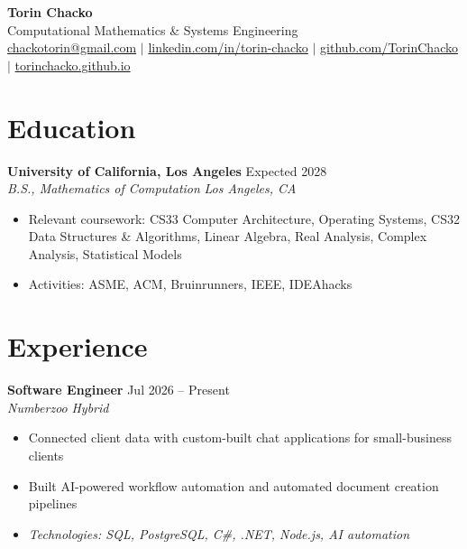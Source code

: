 \documentclass[10pt,letterpaper]{article}
\newcommand{\entry}[4]{%
    \textbf{#1} \hfill #2 \\
    \textit{#3} \hfill \textit{#4} \\
    \vspace{2pt}
}
\begin{document}
\small

\begin{center}
    {\LARGE \bfseries Torin Chacko} \\[5pt]
    Computational Mathematics \& Systems Engineering \\[4pt]
    \href{mailto:chackotorin@gmail.com}{chackotorin@gmail.com}
    \quad $|$ \quad
    \href{https://linkedin.com/in/torin-chacko}{linkedin.com/in/torin-chacko}
    \quad $|$ \quad
    \href{https://github.com/TorinChacko}{github.com/TorinChacko}
    \quad $|$ \quad
    \href{https://torinchacko.github.io}{torinchacko.github.io}
\end{center}

\vspace{3pt}

\section*{Education}

\entry
    {University of California, Los Angeles}
    {Expected 2028}
    {B.S., Mathematics of Computation}
    {Los Angeles, CA}

\begin{itemize}
    \item Relevant coursework: CS33 Computer Architecture, Operating Systems, CS32 Data Structures \& Algorithms, Linear Algebra, Real Analysis, Complex Analysis, Statistical Models
    \item Activities: ASME, ACM, Bruinrunners, IEEE, IDEAhacks
\end{itemize}

\vspace{3pt}

\section*{Experience}

\entry
    {Software Engineer}
    {Jul 2026 -- Present}
    {Numberzoo}
    {Hybrid}

\begin{itemize}
    \item Connected client data with custom-built chat applications for small-business clients
    \item Built AI-powered workflow automation and automated document creation pipelines
    \item \textit {Technologies: SQL, PostgreSQL, C\#, .NET, Node.js, AI automation}
\end{itemize}
\end{document}
